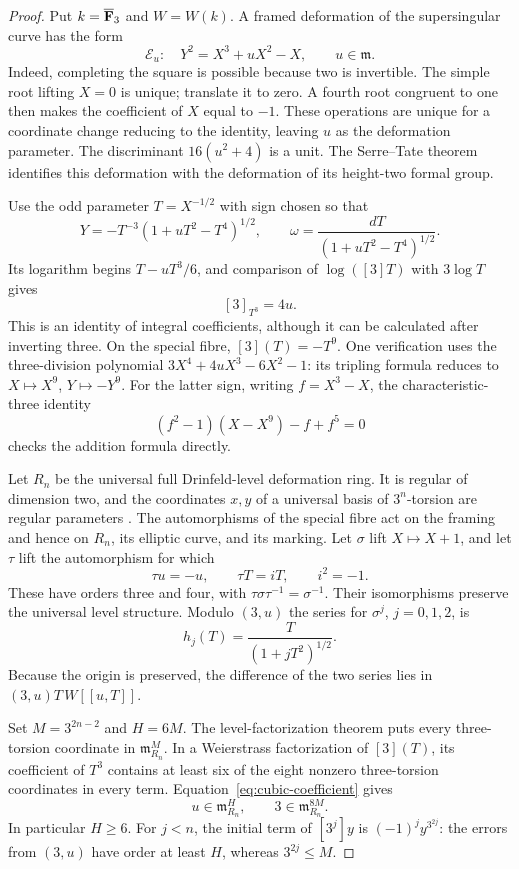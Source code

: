 \begin{proof}
Put $k=\overline{\mathbf F}_3$ and $W=W(k)$. A framed deformation of the supersingular curve has the form
\begin{equation}\label{eq:elliptic-family}
 \mathcal E_u:\quad Y^2=X^3+uX^2-X,\qquad u\in\mathfrak m.
\end{equation}
Indeed, completing the square is possible because two is invertible. The simple root lifting $X=0$ is unique; translate it to zero. A fourth root congruent to one then makes the coefficient of $X$ equal to $-1$. These operations are unique for a coordinate change reducing to the identity, leaving $u$ as the deformation parameter. The discriminant $16(u^2+4)$ is a unit. The Serre--Tate theorem identifies this deformation with the deformation of its height-two formal group.

Use the odd parameter $T=X^{-1/2}$ with sign chosen so that
\[
 Y=-T^{-3}(1+uT^2-T^4)^{1/2},\qquad
 \omega=\frac{dT}{(1+uT^2-T^4)^{1/2}}.
\]
Its logarithm begins $T-uT^3/6$, and comparison of $\log([3]T)$ with $3\log T$ gives
\begin{equation}\label{eq:cubic-coefficient}
 [3]_{T^3}=4u.
\end{equation}
This is an identity of integral coefficients, although it can be calculated after inverting three. On the special fibre, $[3](T)=-T^9$. One verification uses the three-division polynomial $3X^4+4uX^3-6X^2-1$: its tripling formula reduces to $X\mapsto X^9$, $Y\mapsto-Y^9$. For the latter sign, writing $f=X^3-X$, the characteristic-three identity
\[
 (f^2-1)(X-X^9)-f+f^5=0
\]
checks the addition formula directly.

Let $R_n$ be the universal full Drinfeld-level deformation ring. It is regular of dimension two, and the coordinates $x,y$ of a universal basis of $3^n$-torsion are regular parameters \citep[Theorem~2.1.2(ii), p.~437; Proposition~2.2.3(i), p.~439]{CarterStrauch2021}. The automorphisms of the special fibre act on the framing and hence on $R_n$, its elliptic curve, and its marking. Let $\sigma$ lift $X\mapsto X+1$, and let $\tau$ lift the automorphism for which
\[
 \tau u=-u,\qquad \tau T=iT,\qquad i^2=-1.
\]
These have orders three and four, with $\tau\sigma\tau^{-1}=\sigma^{-1}$. Their isomorphisms preserve the universal level structure. Modulo $(3,u)$ the series for $\sigma^j$, $j=0,1,2$, is
\[
 h_j(T)=\frac{T}{(1+jT^2)^{1/2}}.
\]
Because the origin is preserved, the difference of the two series lies in $(3,u)T\,W[[u,T]]$.

Set $M=3^{2n-2}$ and $H=6M$. The level-factorization theorem puts every three-torsion coordinate in $\mathfrak m_{R_n}^{M}$. In a Weierstrass factorization of $[3](T)$, its coefficient of $T^3$ contains at least six of the eight nonzero three-torsion coordinates in every term. Equation~\eqref{eq:cubic-coefficient} gives
\begin{equation}\label{eq:deformation-orders}
 u\in\mathfrak m_{R_n}^{H},\qquad
 3\in\mathfrak m_{R_n}^{8M}.
\end{equation}
In particular $H\ge6$. For $j<n$, the initial term of $[3^j]y$ is $(-1)^j y^{3^{2j}}$: the errors from $(3,u)$ have order at least $H$, whereas $3^{2j}\le M$.


\end{proof}

